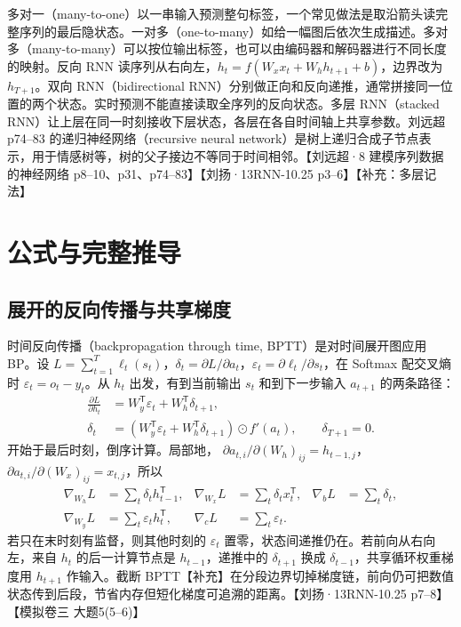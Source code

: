 \documentclass[UTF8,a4paper,zihao=-4,fontset=fandol]{ctexrep}
\begin{document}
多对一（many-to-one）以一串输入预测整句标签，一个常见做法是取沿箭头读完整序列的最后隐状态。一对多（one-to-many）如给一幅图后依次生成描述。多对多（many-to-many）可以按位输出标签，也可以由编码器和解码器进行不同长度的映射。反向 RNN 读序列从右向左，$h_t=f(W_xx_t+W_hh_{t+1}+b)$，边界改为 $h_{T+1}$。双向 RNN（bidirectional RNN）分别做正向和反向递推，通常拼接同一位置的两个状态。实时预测不能直接读取全序列的反向状态。多层 RNN（stacked RNN）让上层在同一时刻接收下层状态，各层在各自时间轴上共享参数。刘远超 p74--83 的递归神经网络（recursive neural network）是树上递归合成子节点表示，用于情感树等，树的父子接边不等同于时间相邻。【刘远超·8 建模序列数据的神经网络 p8--10、p31、p74--83】【刘扬·13RNN-10.25 p3--6】【补充：多层记法】

\section{公式与完整推导}

\subsection*{展开的反向传播与共享梯度}

时间反向传播（backpropagation through time, BPTT）是对时间展开图应用 BP。设 $L=\sum_{t=1}^T\ell_t(s_t)$，$\delta_t=\partial L/\partial a_t$，$\varepsilon_t=\partial\ell_t/\partial s_t$，在 Softmax 配交叉熵时 $\varepsilon_t=o_t-y_t$。从 $h_t$ 出发，有到当前输出 $s_t$ 和到下一步输入 $a_{t+1}$ 的两条路径：
\begin{align*}
 \frac{\partial L}{\partial h_t}
 &=W_y^{\mathsf T}\varepsilon_t+W_h^{\mathsf T}\delta_{t+1},\\
 \delta_t&=\left(W_y^{\mathsf T}\varepsilon_t+
                 W_h^{\mathsf T}\delta_{t+1}\right)\odot f'(a_t),
                 \qquad\delta_{T+1}=0.
\end{align*}
开始于最后时刻，倒序计算。局部地，
$\partial a_{t,i}/\partial(W_h)_{ij}=h_{t-1,j}$，
$\partial a_{t,i}/\partial(W_x)_{ij}=x_{t,j}$，所以
\begin{align*}
 \nabla_{W_h}L&=\sum_t\delta_t h_{t-1}^{\mathsf T},&
 \nabla_{W_x}L&=\sum_t\delta_t x_t^{\mathsf T},&
 \nabla_b L&=\sum_t\delta_t,\\
 \nabla_{W_y}L&=\sum_t\varepsilon_t h_t^{\mathsf T},&
 \nabla_c L&=\sum_t\varepsilon_t .
\end{align*}
若只在末时刻有监督，则其他时刻的 $\varepsilon_t$ 置零，状态间递推仍在。若前向从右向左，来自 $h_t$ 的后一计算节点是 $h_{t-1}$，递推中的 $\delta_{t+1}$ 换成 $\delta_{t-1}$，共享循环权重梯度用 $h_{t+1}$ 作输入。截断 BPTT【补充】在分段边界切掉梯度链，前向仍可把数值状态传到后段，节省内存但短化梯度可追溯的距离。【刘扬·13RNN-10.25 p7--8】【模拟卷三 大题5(5--6)】
\end{document}
